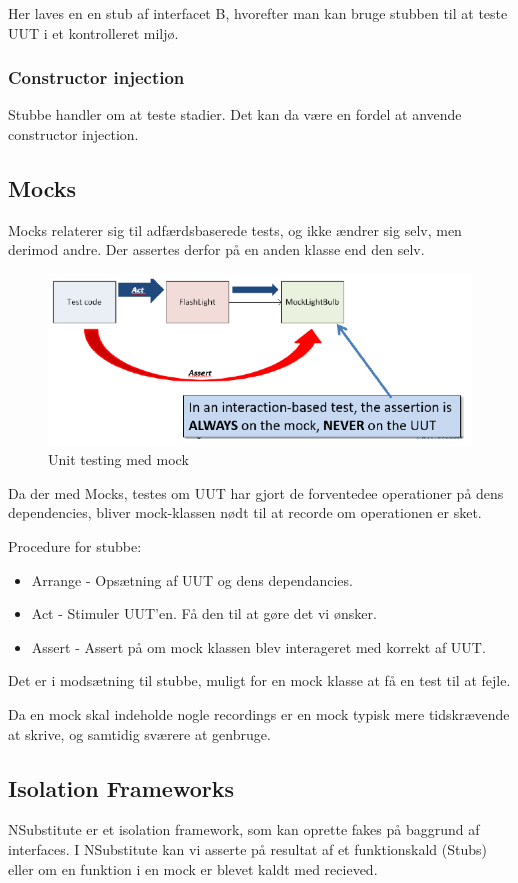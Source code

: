 Her laves en en stub af interfacet B, hvorefter man kan bruge stubben til at teste UUT i et kontrolleret miljø.

\subsubsection{Constructor injection}
Stubbe handler om at teste stadier. Det kan da være en fordel at anvende constructor injection.



\subsection{Mocks}
Mocks relaterer sig til adfærdsbaserede tests, og ikke ændrer sig selv, men derimod andre. Der assertes derfor på en anden klasse end den selv.

\begin{figure}[H]
\centering
\includegraphics[width=0.7\linewidth]{figs/mockTest.PNG}
\caption{Unit testing med mock}
\label{fig:mockTest}
\end{figure}

Da der med Mocks, testes om UUT har gjort de forventedee operationer på dens dependencies, bliver mock-klassen nødt til at recorde om operationen er sket.

Procedure for stubbe:
\begin{itemize}
	\item Arrange - Opsætning af UUT og dens dependancies.
	\item Act - Stimuler UUT'en. Få den til at gøre det vi ønsker.
	\item Assert - Assert på om mock klassen blev interageret med korrekt af UUT.
\end{itemize}

Det er i modsætning til stubbe, muligt for en mock klasse at få en test til at fejle.

Da en mock skal indeholde nogle recordings er en mock typisk mere tidskrævende at skrive, og samtidig sværere at genbruge.


\subsection{Isolation Frameworks}

NSubstitute er et isolation framework, som kan oprette fakes på baggrund af interfaces. I NSubstitute kan vi asserte på resultat af et funktionskald (Stubs) eller om en funktion i en mock er blevet kaldt med recieved.